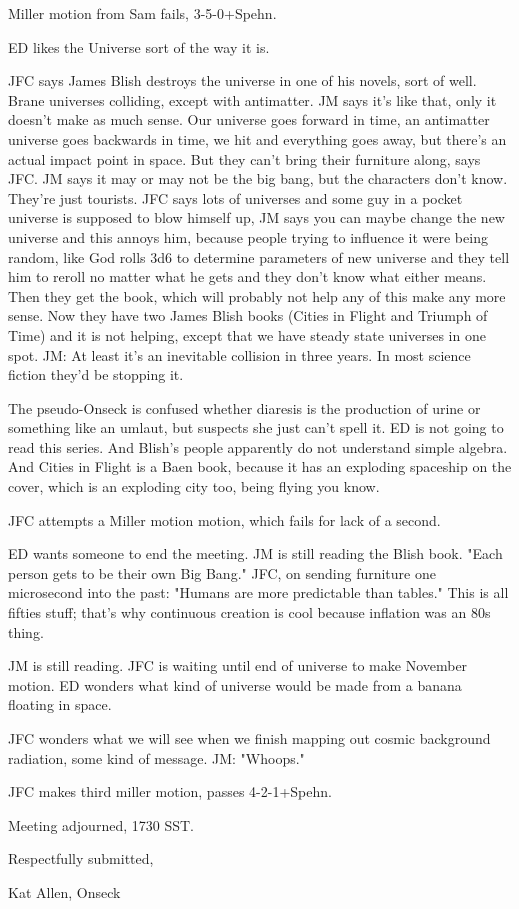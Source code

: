 \documentclass[10pt]{article}
\begin{document}
Miller motion from Sam fails, 3-5-0+Spehn.  

ED likes the Universe sort of the way it is.  

JFC says James Blish destroys the universe in one of his novels, sort
of well.  Brane universes colliding, except with antimatter.  JM says
it's like that, only it doesn't make as much sense.  Our universe goes
forward in time, an antimatter universe goes backwards in time, we hit
and everything goes away, but there's an actual impact point in space.
But they can't bring their furniture along, says JFC.  JM says it may
or may not be the big bang, but the characters don't know.  They're
just tourists.  JFC says lots of universes and some guy in a pocket
universe is supposed to blow himself up, JM says you can maybe change
the new universe and this annoys him, because people trying to
influence it were being random, like God rolls 3d6 to determine
parameters of new universe and they tell him to reroll no matter what
he gets and they don't know what either means.  Then they get the
book, which will probably not help any of this make any more sense.
Now they have two James Blish books (Cities in Flight and Triumph of
Time) and it is not helping, except that we have steady state
universes in one spot.  JM: At least it's an inevitable collision in
three years.  In most science fiction they'd be stopping it.

The pseudo-Onseck is confused whether diaresis is the production of
urine or something like an umlaut, but suspects she just can't spell
it.  ED is not going to read this series.  And Blish's people
apparently do not understand simple algebra.  And Cities in Flight is
a Baen book, because it has an exploding spaceship on the cover, which
is an exploding city too, being flying you know.

JFC attempts a Miller motion motion, which fails for lack of a second.

ED wants someone to end the meeting.  JM is still reading the Blish
book.  "Each person gets to be their own Big Bang."  JFC, on sending
furniture one microsecond into the past: "Humans are more predictable
than tables."  This is all fifties stuff; that's why continuous
creation is cool because inflation was an 80s thing.  

JM is still reading.  JFC is waiting until end of universe to make
November motion.  ED wonders what kind of universe would be made from
a banana floating in space.  

JFC wonders what we will see when we finish mapping out cosmic
background radiation, some kind of message.  JM: "Whoops."  

JFC makes third miller motion, passes 4-2-1+Spehn.

\vspace{12pt}

\noindent
Meeting adjourned, 1730 SST.

\vspace{18pt}

\centerline{Respectfully submitted,}
\centerline{Kat Allen,  Onseck}
\end{document}
